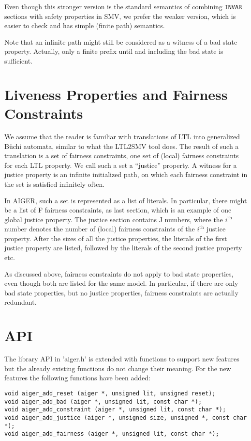\documentclass{llncs}
\begin{document}
Even though this stronger version is the standard semantics of combining
\texttt{INVAR} sections with safety properties in SMV, we prefer the weaker
version, which is easier to check and has simple (finite path) semantics.

Note that an infinite path might still be considered as a witness of a bad
state property.  Actually, only a finite prefix until and including the bad
state is sufficient.

\section{Liveness Properties and Fairness Constraints}

We assume that the reader is familiar with translations of LTL into
generalized B\"{u}chi automata, similar to what the LTL2SMV tool does.
The result of such a translation is a set of fairness constraints, one set
of (local) fairness constraints for each LTL property.  We call such a set
a ``justice'' property.  A witness for a justice property is an infinite
initialized path, on which each fairness constraint in the set is satisfied
infinitely often.

In AIGER, such a set is represented as a list of literals.  In particular,
there might be a list of F fairness constraints, as last section, which is
an example of one global justice property.  The justice section contains J
numbers, where the $i^{\mathrm{th}}$ number denotes the number of (local)
fairness constraints of the $i^\mathrm{th}$ justice property.  After the
sizes of all the justice properties, the literals of the first justice
property are listed, followed by the literals of the second justice property
etc.

As discussed above, fairness constraints do not apply to bad state
properties, even though both are listed for the same model.  In particular,
if there are only bad state properties, but no justice properties, fairness
constraints are actually redundant.

\section{API}

The library API in 'aiger.h' is extended with functions to support new
features but the already existing functions do not change their meaning.
For the new features the following functions have been added:
{\small
\begin{verbatim}
void aiger_add_reset (aiger *, unsigned lit, unsigned reset);
void aiger_add_bad (aiger *, unsigned lit, const char *);
void aiger_add_constraint (aiger *, unsigned lit, const char *);
void aiger_add_justice (aiger *, unsigned size, unsigned *, const char *);
void aiger_add_fairness (aiger *, unsigned lit, const char *);
\end{verbatim}}
\end{document}
